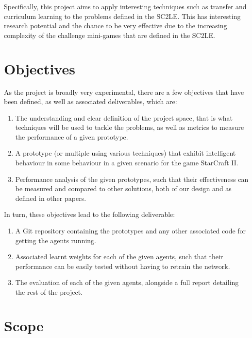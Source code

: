 Specifically, this project aims to apply interesting techniques such as
transfer and curriculum learning to the problems defined in the SC2LE\@.
This has interesting research potential and the chance to be very effective
due to the increasing complexity of the challenge mini-games that are defined
in the SC2LE\@.

\section{Objectives}

As the project is broadly very experimental, there are a few objectives that
have been defined, as well as associated deliverables, which are:

\begin{enumerate}
    \item The understanding and clear definition of the project space, that is
        what techniques will be used to tackle the problems, as well as
        metrics to measure the performance of a given prototype.
    \item A prototype (or multiple using various techniques) that exhibit
        intelligent behaviour in some behaviour in a given scenario for
        the game StarCraft II\@.
    \item Performance analysis of the given prototypes, such that their
        effectiveness can be measured and compared to other solutions, both of
        our design and as defined in other papers.
\end{enumerate}

In turn, these objectives lead to the following deliverable:

\begin{enumerate}
    \item A Git repository containing the prototypes and any other associated
        code for getting the agents running.
    \item Associated learnt weights for each of the given agents, such that
        their performance can be easily tested without having to retrain
        the network.
    \item The evaluation of each of the given agents, alongside a full report
        detailing the rest of the project.
\end{enumerate}

\section{Scope}

